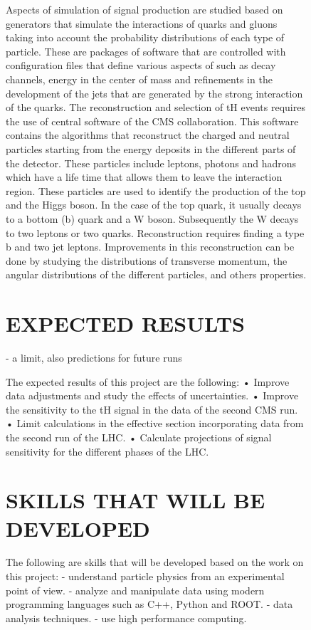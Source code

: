 \documentclass[final,3p]{CSP}
\begin{document}
\begin{figure}
Aspects of simulation of signal production are studied based on generators that simulate the 
interactions of quarks and gluons taking into account the probability distributions of each 
type of particle. These are packages of software that are controlled with configuration files 
that define various aspects of such as decay channels, energy in the center of mass and 
refinements in the development of the jets that are generated by the strong interaction of 
the quarks. The reconstruction and selection of tH events requires the use of central 
software of the CMS collaboration. This software contains the algorithms that reconstruct the 
charged and neutral particles starting from the energy deposits in the different parts of the 
detector. These particles include leptons, photons and hadrons which have a life time that 
allows them to leave the interaction region. These particles are used to identify the 
production of the top and the Higgs boson. In the case of the top quark, it usually decays to 
a bottom (b) quark and a W boson. Subsequently the W decays to two leptons or two quarks. 
Reconstruction requires finding a type b and two jet leptons. Improvements in this 
reconstruction can be done by studying the distributions of transverse momentum, the angular 
distributions of the different particles, and others properties.

\section{EXPECTED RESULTS}
- a limit, also predictions for future runs

The expected results of this project are the following:
• Improve data adjustments and study the effects of uncertainties.
• Improve the sensitivity to the tH signal in the data of the second CMS run.
• Limit calculations in the effective section incorporating data from the second
run of the LHC.
• Calculate projections of signal sensitivity for the different phases of the LHC.


\cleardoublepage



\appendix
\section{SKILLS THAT WILL BE DEVELOPED}
The following are skills that will be developed based on the work on this project:
- understand particle physics from an experimental point of view.
- analyze and manipulate data using modern programming languages such as C++, Python and ROOT.
- data analysis techniques.
- use high performance computing.


\end{figure}
\end{document}
